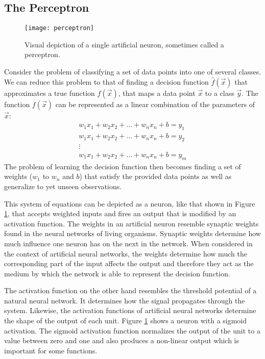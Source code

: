\subsection{The Perceptron} \label{sec:background-artificial-neural-networks-perceptron}

\begin{figure}[t]
	\centering
	\texttt{[image: perceptron]}
	\caption{Visual depiction of a single artificial neuron, sometimes called a perceptron.}
	\label{fig:perceptron}
\end{figure}

Consider the problem of classifying a set of data points into one of several classes. We can reduce this problem to that of finding a decision function $\hat{f}(\vec{x})$ that approximates a true function $f(\vec{x})$, that maps a data point $\vec{x}$ to a class $\vec{y}$. The function $f(\vec{x})$ can be represented as a linear combination of the parameters of $\vec{x}$:
\begin{gather*}
	w_1 x_1 + w_2 x_2 + ... + w_n x_n + b = y_1\\
	w_1 x_1 + w_2 x_2 + ... + w_n x_n + b = y_2\\
	\vdots\\ 
	w_1 x_1 + w_2 x_2 + ... + w_n x_n + b = y_m
\end{gather*}
The problem of learning the decision function then becomes finding a set of weights ($w_1$ to $w_n$ and $b$) that satisfy the provided data points as well as generalize to yet unseen observations\cite{Le15atutorial}.

This system of equations can be depicted as a neuron, like that shown in Figure \ref{fig:perceptron}, that accepts weighted inputs and fires an output that is modified by an activation function. The weights in an artificial neuron resemble synaptic weights found in the neural networks of living organisms. Synaptic weights determine how much influence one neuron has on the next in the network. When considered in the context of artificial neural networks, the weights determine how much the corresponding part of the input affects the output and therefore they act as the medium by which the network is able to represent the decision function\cite{Mitchell}.  

The activation function on the other hand resembles the threshold potential of a natural neural network. It determines how the signal propagates through the system. Likewise, the activation functions of artificial neural networks determine the shape of the output of each unit. Figure \ref{fig:perceptron} shows a neuron with a sigmoid activation. The sigmoid activation function normalizes the output of the unit to a value between zero and one and also produces a non-linear output which is important for some functions\cite{Goodfellow-et-al-2016}.

